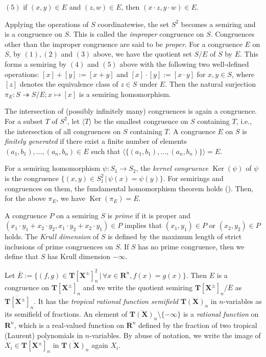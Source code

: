 \documentclass[a4paper,12pt]{amsart}
\begin{document}
$(5)$ if $(x, y) \in E$ and $(z, w) \in E$, then $(x \cdot z, y \cdot w) \in E$.

Applying the operations of $S$ coordinatewise, the set $S^2$ becomes a semiring and is a congruence on $S$.
This is called the \textit{improper} congruence on $S$.
Congruences other than the improper congruence are said to be \textit{proper}.
For a congruence $E$ on $S$, by $(1), (2)$ and $(3)$ above, we have the quotient set $S / E$ of $S$ by $E$.
This forms a semiring by $(4)$ and $(5)$ above with the following two well-defined operations: $[x] + [y] := [x + y]$ and $[x] \cdot [y] := [x \cdot y]$ for $x, y \in S$, where $[z]$ denotes the equivalence class of $z \in S$ under $E$.
Then the natural surjection $\pi_E : S \twoheadrightarrow S / E; x \mapsto [x]$ is a semiring homomorphism.

The intersection of (possibly infinitely many) congruences is again a congruence.
For a subset $T$ of $S^2$, let $\langle T \rangle$ be the smallest congruence on $S$ containing $T$, i.e., the intersection of all congruences on $S$ containing $T$.
A congruence $E$ on $S$ is \textit{finitely generated} if there exist a finite number of elements $(a_1, b_1), \ldots, (a_n, b_n) \in E$ such that $\langle \{ (a_1, b_1), \ldots, (a_n, b_n) \} \rangle = E$.

For a semiring homomorphism $\psi : S_1 \to S_2$, the \textit{kernel congruence} $\operatorname{Ker}(\psi)$ of $\psi$ is the congruence $\{ (x, y) \in S_1^2 \,|\, \psi(x) = \psi(y) \}$.
For semirings and congruences on them, the fundamental homomorphism theorem holds (\cite[Proposition 2.4.4]{Giansiracusa=Giansiracusa}).
Then, for the above $\pi_E$, we have $\operatorname{Ker}(\pi_E) = E$.

A congruence $P$ on a semiring $S$ is \textit{prime} if it is proper and $(x_1 \cdot y_1 + x_2 \cdot y_2, x_1 \cdot y_2 + x_2 \cdot y_1) \in P$ implies that $(x_1, y_1) \in P$ or $(x_2, y_2) \in P$ holds.
The \textit{Krull dimension} of $S$ is defined by the maximum length of strict inclusions of prime congruences on $S$.
If $S$ has no prime congruence, then we define that $S$ has Krull dimension $-\infty$.

Let $\overline{E} := \{ (f, g) \in \boldsymbol{T}[\boldsymbol{X}^{\pm}]_n^2 \,|\, \forall x \in \boldsymbol{R}^n, f(x) = g(x) \}$.
Then $E$ is a congruence on $\boldsymbol{T}[\boldsymbol{X}^{\pm}]_n$ and we write the quotient semiring $\boldsymbol{T}[\boldsymbol{X}^{\pm}]_n / \overline{E}$ as $\overline{\boldsymbol{T}[\boldsymbol{X}^{\pm}]}_n$.
It has the \textit{tropical rational function semifield} $\overline{\boldsymbol{T}(\boldsymbol{X})}_n$ in $n$-variables as its semifield of fractions.
An element of $\overline{\boldsymbol{T}(\boldsymbol{X})}_n \setminus \{ -\infty \}$ is a \textit{rational function} on $\boldsymbol{R}^n$, which is a real-valued function on $\boldsymbol{R}^n$ defined by the fraction of two tropical (Laurent) polynomials in $n$-variables.
By abuse of notation, we write the image of $X_i \in \boldsymbol{T}[\boldsymbol{X}^{\pm}]_n$ in $\overline{\boldsymbol{T}(\boldsymbol{X})}_n$ again $X_i$.
\end{document}
